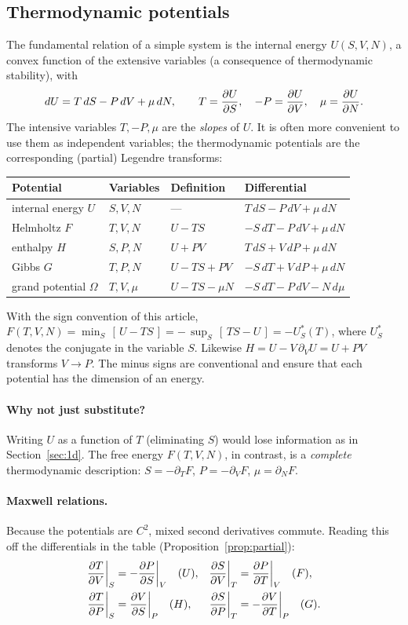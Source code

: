\subsection{Thermodynamic potentials}

The fundamental relation of a simple system is the internal energy
$U(S,V,N)$, a convex function of the extensive variables (a consequence of
thermodynamic stability), with
\[
  d U=T\,d S-P\,d V+\mu\,d N,\qquad
  T=\frac{\partial U}{\partial S},\quad -P=\frac{\partial U}{\partial V},\quad \mu=\frac{\partial U}{\partial N} .
\]
The intensive variables $T,-P,\mu$ are the \emph{slopes} of $U$.  It is
often more convenient to use them as independent variables; the thermodynamic
potentials are the corresponding (partial) Legendre transforms:
\begin{center}
\begin{tabular}{@{}llll@{}}
\toprule
Potential & Variables & Definition & Differential\\
\midrule
internal energy $U$ & $S,V,N$ & --- & $T\,d S-P\,d V+\mu\,d N$\\
Helmholtz $F$ & $T,V,N$ & $U-TS$ & $-S\,d T-P\,d V+\mu\,d N$\\
enthalpy $H$ & $S,P,N$ & $U+PV$ & $T\,d S+V\,d P+\mu\,d N$\\
Gibbs $G$ & $T,P,N$ & $U-TS+PV$ & $-S\,d T+V\,d P+\mu\,d N$\\
grand potential $\Omega$ & $T,V,\mu$ & $U-TS-\mu N$ & $-S\,d T-P\,d V-N\,d\mu$\\
\bottomrule
\end{tabular}
\end{center}
With the sign convention of this article, $F(T,V,N)=\min_S\,[\,U-TS\,]
=-\,\sup_S\,[\,TS-U\,]=-U^*_S(T)$, where $U^*_S$ denotes the conjugate in the
variable $S$.  Likewise $H=U-V\,\partial_VU=U+PV$ transforms $V\to P$.  The
minus signs are conventional and ensure that each potential has the dimension
of an energy.

\paragraph{Why not just substitute?}
Writing $U$ as a function of $T$ (eliminating $S$) would lose information as
in Section~\ref{sec:1d}.  The free energy $F(T,V,N)$, in contrast, is a
\emph{complete} thermodynamic description: $S=-\partial_TF$, $P=-\partial_VF$,
$\mu=\partial_NF$.

\paragraph{Maxwell relations.}
Because the potentials are $C^2$, mixed second derivatives commute.  Reading
this off the differentials in the table (Proposition~\ref{prop:partial}):
\begin{align*}
 \frac{\partial T}{\partial V}\bigg|_S&=-\frac{\partial P}{\partial S}\bigg|_V \quad(U), &
 \frac{\partial S}{\partial V}\bigg|_T&=\frac{\partial P}{\partial T}\bigg|_V \quad(F),\\
 \frac{\partial T}{\partial P}\bigg|_S&=\frac{\partial V}{\partial S}\bigg|_P \quad(H), &
 \frac{\partial S}{\partial P}\bigg|_T&=-\frac{\partial V}{\partial T}\bigg|_P \quad(G).
\end{align*}

